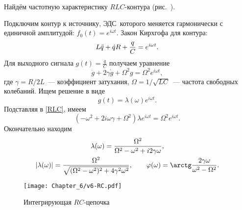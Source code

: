 \begin{lab:example}\label{example:RLC}
Найдём частотную характеристику $RLC$-контура (рис.~).

Подключим контур к источнику, ЭДС~которого меняется гармонически 
с единичной амплитудой: $f_0(t)=e^{i\omega t}$.
Закон Кирхгофа для контура:
\begin{equation}
    \eqmark{RLC}
L\ddot{q} + \dot{q}R+\frac{q}{C}=e^{i\omega t}.
\end{equation}
Для выходного сигнала $g(t)=\frac{q}{C}$ получаем уравнение
\begin{equation*}
\ddot{g}+2\gamma\dot{g}+\Omega^2g=\Omega^2 e^{i\omega t},
\end{equation*}
где $\gamma = R/2L$~--- коэффициент затухания,
$\Omega = 1/\sqrt{LC}$~--- частота свободных колебаний.
Ищем решение в виде
\begin{equation*}
g(t)=\lambda(\omega)e^{i\omega t}.
\end{equation*}
Подставляя в \eqref{RLC}, имеем
\begin{equation*}
    (-\omega^2 +2i\omega\gamma + \Omega^2) \lambda e^{i\omega t}=\Omega^2 e^{i\omega t}.
\end{equation*}
Окончательно находим
\begin{equation}
    \eqmark{RLC-lambda}
\begin{gathered}
\lambda(\omega)=\frac{\Omega^2}{\Omega^2-\omega^2+i2\gamma\omega},\\
\left|\lambda(\omega)\right|=\frac{\Omega^2}{\sqrt{
(\Omega^2-\omega^2)^2+4\gamma^2\omega^2}},
\qquad \varphi(\omega)=\arctg\frac{2\gamma\omega}{\omega^2-\Omega^2}.
\end{gathered}
\end{equation}
\end{lab:example}

\begin{wrapfigure}[11]{o}{0.25\textwidth}
\centering\texttt{[image: Chapter\_6/v6-RC.pdf]}
\caption{\footnotesize Интегрирующая $RC$-цепочка}
\end{wrapfigure}

